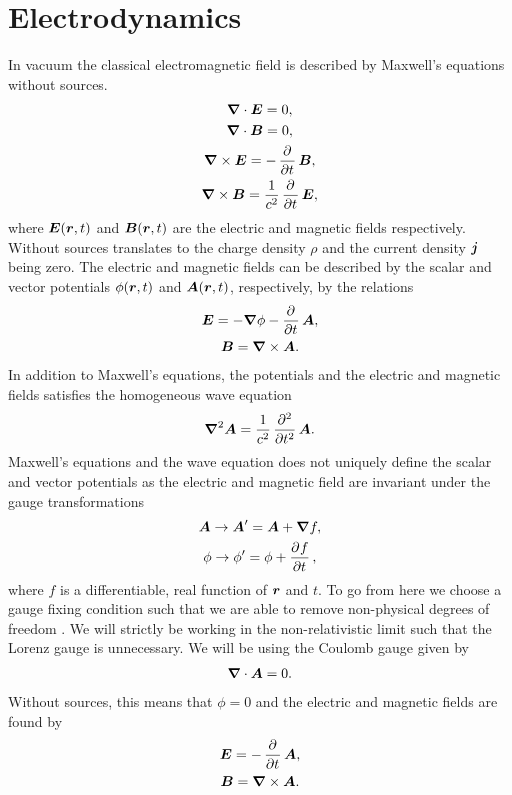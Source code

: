     \section{Electrodynamics}
        In vacuum the classical electromagnetic field is described by Maxwell's
        equations without sources.
        \begin{gather}
            \vfg{\nabla}\cdot\vfg{E} = 0, \\
            \vfg{\nabla}\cdot\vfg{B} = 0, \\
            \vfg{\nabla}\times\vfg{E} = -\dpd{}{t}\vfg{B}, \\
            \vfg{\nabla}\times\vfg{B} = \frac{1}{c^2}\dpd{}{t}\vfg{E},
        \end{gather}
        where $\boldsymbol{E}(\boldsymbol{r}, t)$ and $\boldsymbol{B}(\boldsymbol{r}, t)$ are the
        electric and magnetic fields respectively.
        Without sources translates to the charge density $\rho$ and the current
        density $\boldsymbol{j}$ being zero.
        The electric and magnetic fields can be described by the scalar and
        vector potentials $\phi(\boldsymbol{r}, t)$ and $\boldsymbol{A}(\boldsymbol{r}, t)$,
        respectively, by the relations
        \begin{gather}
            \vfg{E} = -\vfg{\nabla}\phi - \dpd{}{t}\vfg{A}, \\
            \vfg{B} = \vfg{\nabla}\times\vfg{A}.
        \end{gather}
        In addition to Maxwell's equations, the potentials and the electric and
        magnetic fields satisfies the homogeneous wave equation
        \cite{joachain2012atoms}
        \begin{align}
            \vfg{\nabla}^2\vfg{A} = \frac{1}{c^2}\dpd[2]{}{t}\vfg{A}.
            \label{eq:wave-equation}
        \end{align}
        Maxwell's equations and the wave equation does not uniquely define the
        scalar and vector potentials as the electric and magnetic field are
        invariant under the gauge transformations
        \begin{gather}
            \vfg{A} \to \vfg{A}' = \vfg{A} + \vfg{\nabla} f, \\
            \phi \to \phi' = \phi + \dpd{f}{t},
        \end{gather}
        where $f$ is a differentiable, real function of $\boldsymbol{r}$ and $t$.
        To go from here we choose a gauge fixing condition such that we are able
        to remove non-physical degrees of freedom \cite{modern-qm}.
        We will strictly be working in the non-relativistic limit such that the
        Lorenz gauge is unnecessary.
        We will be using the Coulomb gauge given by
        \begin{align}
            \boldsymbol{\nabla}\cdot\boldsymbol{A} = 0.
        \end{align}
        Without sources, this means that $\phi = 0$ and the electric and
        magnetic fields are found by
        \begin{gather}
            \vfg{E} = -\dpd{}{t}\vfg{A}, \\
            \vfg{B} = \vfg{\nabla}\times \vfg{A}.
        \end{gather}


